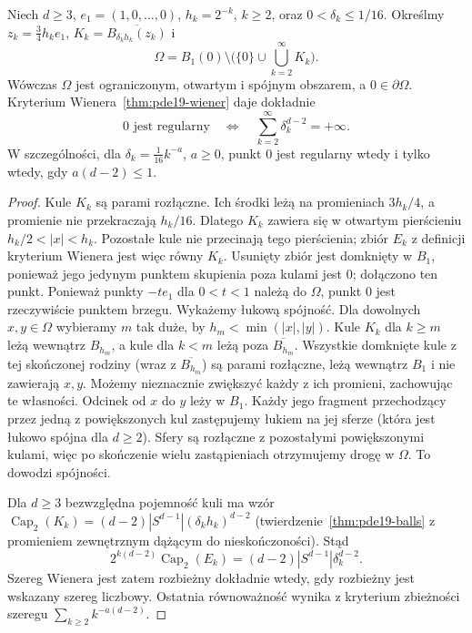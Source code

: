 \begin{przyklad}
\label{ex:pde19-wiener-balls}
Niech $d\ge3$, $e_1=(1,0,\ldots,0)$, $h_k=2^{-k}$,
$k\ge2$, oraz $0<\delta_k\le1/16$. Określmy
$z_k=\tfrac34h_ke_1$, $K_k=\overline{B_{\delta_kh_k}(z_k)}$
i
\[
 \Omega=B_1(0)\setminus\biggl(\{0\}\cup
 \bigcup_{k=2}^\infty K_k\biggr).
\]
Wówczas $\Omega$ jest ograniczonym, otwartym i spójnym
obszarem, a $0\in\partial\Omega$. Kryterium
Wienera~\ref{thm:pde19-wiener} daje dokładnie
\[
 0\text{ jest regularny}\quad\Longleftrightarrow\quad
 \sum_{k=2}^\infty\delta_k^{d-2}=+\infty.
\]
W szczególności, dla $\delta_k=\frac1{16}k^{-a}$,
$a\ge0$, punkt $0$ jest regularny wtedy i tylko wtedy,
gdy $a(d-2)\le1$.
\end{przyklad}
\begin{proof}
Kule $K_k$ są parami rozłączne. Ich środki leżą na
promieniach $3h_k/4$, a promienie nie przekraczają
$h_k/16$. Dlatego $K_k$ zawiera się w otwartym
pierścieniu $h_k/2<|x|<h_k$. Pozostałe kule nie przecinają
tego pierścienia; zbiór $E_k$ z definicji kryterium Wienera
jest więc równy $K_k$. Usunięty zbiór jest domknięty
w $B_1$, ponieważ jego jedynym punktem skupienia poza
kulami jest $0$; dołączono ten punkt. Ponieważ punkty $-te_1$ dla $0<t<1$ należą do
$\Omega$, punkt $0$ jest rzeczywiście punktem brzegu.
Wykażemy łukową spójność. Dla dowolnych $x,y\in\Omega$
wybieramy $m$ tak duże, by $h_m<\min(|x|,|y|)$.
Kule $K_k$ dla $k\ge m$ leżą wewnątrz $B_{h_m}$,
a kule dla $k<m$ leżą poza $\overline{B_{h_m}}$.
Wszystkie domknięte kule z tej skończonej rodziny
(wraz z $\overline{B_{h_m}}$) są parami rozłączne,
leżą wewnątrz $B_1$ i nie zawierają $x,y$.
Możemy nieznacznie zwiększyć każdy z ich promieni,
zachowując te własności. Odcinek od $x$ do $y$ leży
w $B_1$. Każdy jego fragment przechodzący przez jedną
z powiększonych kul zastępujemy łukiem na jej sferze
(która jest łukowo spójna dla $d\ge2$).
Sfery są rozłączne z pozostałymi powiększonymi kulami,
więc po skończenie wielu zastąpieniach otrzymujemy
drogę w $\Omega$. To dowodzi spójności.

Dla $d\ge3$ bezwzględna pojemność kuli ma wzór
$\operatorname{Cap}_2(K_k)=(d-2)|S^{d-1}|
(\delta_kh_k)^{d-2}$ (twierdzenie~\ref{thm:pde19-balls}
z promieniem zewnętrznym dążącym do nieskończoności).
Stąd
\[
 2^{k(d-2)}\operatorname{Cap}_2(E_k)
 =(d-2)|S^{d-1}|\delta_k^{d-2}.
\]
Szereg Wienera jest zatem rozbieżny dokładnie wtedy,
gdy rozbieżny jest wskazany szereg liczbowy. Ostatnia
równoważność wynika z kryterium zbieżności szeregu
$\sum_{k\ge2}k^{-a(d-2)}$.
\end{proof}

